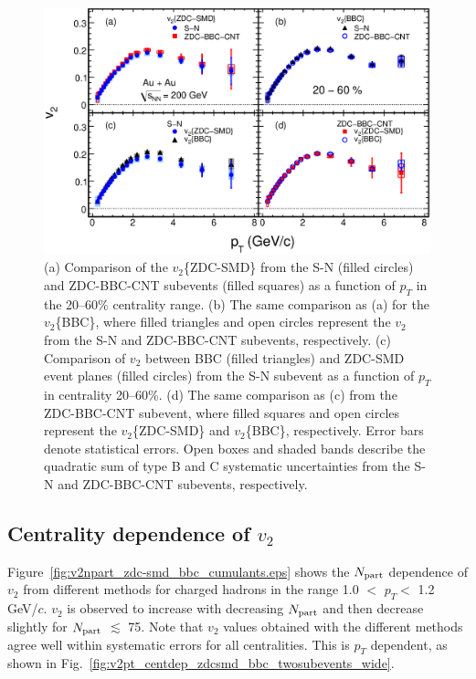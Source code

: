 \documentclass[aps,prc,superscriptaddress,showpacs,floatfix,twocolumn]{revtex4}
\newcommand \gevc{GeV/$c$\xspace}
\newcommand \pt{\mbox{$p_T$}\xspace}
\newcommand \Np{\mbox{$N_{\rm part}$}\xspace}
\newcommand \Fig{Fig.\xspace}
\begin{document}
\begin{figure}[htb!]
\includegraphics[width=0.85\linewidth]{comparison_v2pt_zdc-smd_bbc_withCNT_cent20-60.eps}

\caption{\label{fig:comparison_v2pt_zdc-smd_bbc_withCNT_cent20-60}
(a) Comparison of the $v_2$\{ZDC-SMD\} from the S-N (filled circles) 
and ZDC-BBC-CNT subevents (filled squares) as a function of \pt 
in the 20--60\% centrality range.
(b) The same comparison as (a) for the $v_2$\{BBC\}, where 
filled triangles and open circles represent the $v_2$ from the 
S-N and ZDC-BBC-CNT subevents, respectively.
(c) Comparison of $v_2$ between BBC (filled triangles) and 
ZDC-SMD event planes (filled circles) from the S-N subevent as a 
function of \pt in centrality 20--60\%.
(d) The same comparison as (c) from the ZDC-BBC-CNT subevent, 
where filled squares and open circles represent the 
$v_2$\{ZDC-SMD\} and $v_2$\{BBC\}, respectively. Error bars 
denote statistical errors. Open boxes and shaded bands describe 
the quadratic sum of type B and C systematic uncertainties from 
the S-N and ZDC-BBC-CNT subevents, respectively.
}
\end{figure}


\subsection{Centrality dependence of $v_2$}

Figure~\ref{fig:v2npart_zdc-smd_bbc_cumulants.eps} shows the \Np 
dependence of $v_2$ from different methods for charged hadrons 
in the range 1.0 $<$ \pt $<$ 1.2 \gevc. $v_2$ is observed to 
increase with decreasing \Np and then decrease slightly for \Np 
$\lesssim$ 75. Note that $v_2$ values obtained with 
the different methods agree well within systematic errors for 
all centralities. This is \pt dependent, as shown in 
\Fig~\ref{fig:v2pt_centdep_zdcsmd_bbc_twosubevents_wide}.
\end{document}
